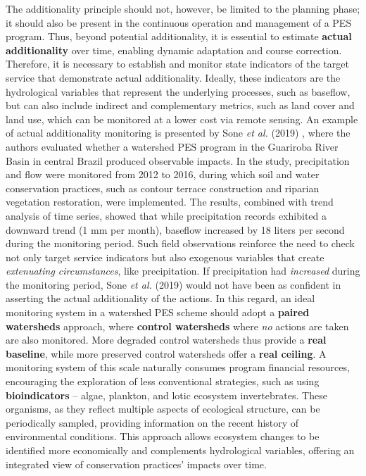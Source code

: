 \documentclass[./main_en.tex]{subfiles}
\begin{document}
The additionality principle should not, however, be limited to the planning phase; it should also be present in the continuous operation and management of a PES program. Thus, beyond potential additionality, it is essential to estimate \textbf{actual additionality} over time, enabling dynamic adaptation and course correction. Therefore, it is necessary to establish and monitor state indicators of the target service that demonstrate actual additionality. Ideally, these indicators are the hydrological variables that represent the underlying processes, such as baseflow, but can also include indirect and complementary metrics, such as land cover and land use, which can be monitored at a lower cost via remote sensing. An example of actual additionality monitoring is presented by Sone \textit{et al.} (2019) \cite{Sone2019a}, where the authors evaluated whether a watershed PES program in the Guariroba River Basin in central Brazil produced observable impacts. In the study, precipitation and flow were monitored from 2012 to 2016, during which soil and water conservation practices, such as contour terrace construction and riparian vegetation restoration, were implemented. The results, combined with trend analysis of time series, showed that while precipitation records exhibited a downward trend (1 mm per month), baseflow increased by 18 liters per second during the monitoring period. Such field observations reinforce the need to check not only target service indicators but also exogenous variables that create \textit{extenuating circumstances}, like precipitation. If precipitation had \textit{increased} during the monitoring period, Sone \textit{et al.} (2019) would not have been as confident in asserting the actual additionality of the actions. In this regard, an ideal monitoring system in a watershed PES scheme should adopt a \textbf{paired watersheds} approach, where \textbf{control watersheds} where \textit{no} actions are taken are also monitored. More degraded control watersheds thus provide a \textbf{real baseline}, while more preserved control watersheds offer a \textbf{real ceiling}. A monitoring system of this scale naturally consumes program financial resources, encouraging the exploration of less conventional strategies, such as using \textbf{bioindicators} -- algae, plankton, and lotic ecosystem invertebrates. These organisms, as they reflect multiple aspects of ecological structure, can be periodically sampled, providing information on the recent history of environmental conditions. This approach allows ecosystem changes to be identified more economically and complements hydrological variables, offering an integrated view of conservation practices’ impacts over time.
\end{document}
